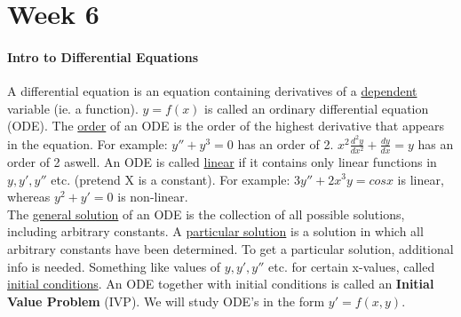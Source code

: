 \documentclass[10pt,letter]{article}
\begin{document}
\pagebreak

\section*{Week 6}
\paragraph{Intro to Differential Equations} A differential equation is an equation containing derivatives of a \underline{dependent} variable (ie. a function). $y=f(x)$ is called an ordinary differential equation (ODE).  The \underline{order} of an ODE is the order of the highest derivative that appears in the equation. For example: $y''+y^3 = 0$ has an order of 2. $x^2\frac{d^2y}{dx^2}+\frac{dy}{dx}=y$ has an order of 2 aswell. An ODE is called \underline{linear} if it contains only linear functions in $y,y', y''$ etc. (pretend X is a constant). For example: $3y''+2x^3y=cosx$ is linear, whereas $y^2+y'=0$ is non-linear.  \\ 
The \underline{general solution} of an ODE is the collection of all possible solutions, including arbitrary constants. A \underline{particular solution} is a solution in which all arbitrary constants have been determined. To get a particular solution, additional info is needed. Something like values of $y,y',y''$ etc. for certain x-values, called \underline{initial conditions}. An ODE together with initial conditions is called an \textbf{Initial Value Problem} (IVP). We will study ODE's in the form $y'=f(x,y)$. 
\end{document}
